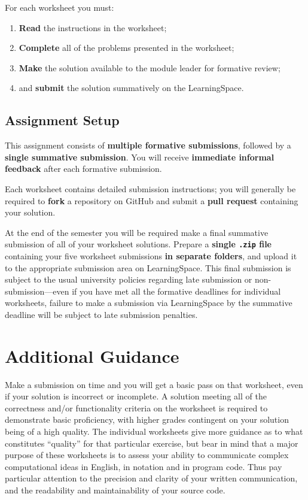 \documentclass{../../fal_assignment}
\begin{document}
	For each worksheet you must:
	
	\begin{enumerate}[label=(\roman*)]
		\item \textbf{Read} the instructions in the worksheet;
		\item \textbf{Complete} all of the problems presented in the worksheet;
		\item \textbf{Make} the solution available to the module leader for formative review;
		\item and \textbf{submit} the solution summatively on the LearningSpace.
	\end{enumerate}
	
	\subsection*{Assignment Setup}
	
	This assignment consists of \textbf{multiple formative submissions}, followed by a \textbf{single summative submission}.
	You will receive \textbf{immediate informal feedback} after each formative submission.
	
	Each worksheet contains detailed submission instructions; you will generally be required to \textbf{fork} a repository on GitHub and submit a \textbf{pull request} containing your solution.
	
	At the end of the semester you will be required make a final summative submission of all of your worksheet solutions.
	Prepare a \textbf{single \texttt{.zip} file} containing your five worksheet submissions \textbf{in separate folders}, and upload it to the appropriate submission area on LearningSpace.
	This final submission is subject to the usual university policies regarding late submission or non-submission---even if you have met all the formative deadlines for individual worksheets,
	failure to make a submission via LearningSpace by the summative deadline will be subject to late submission penalties.
	
	\section*{Additional Guidance}
	
	Make a submission on time and you will get a basic pass on that worksheet,
	even if your solution is incorrect or incomplete.
	A solution meeting all of the correctness and/or functionality criteria on the worksheet is required to demonstrate basic proficiency,
	with higher grades contingent on your solution being of a high quality.
	The individual worksheets give more guidance as to what constitutes ``quality'' for that particular exercise,
	but bear in mind that a major purpose of these worksheets is to assess your ability to communicate
	complex computational ideas in English, in notation and in program code.
	Thus pay particular attention to the precision and clarity of your written communication,
	and the readability and maintainability of your source code.
	
\end{document}
